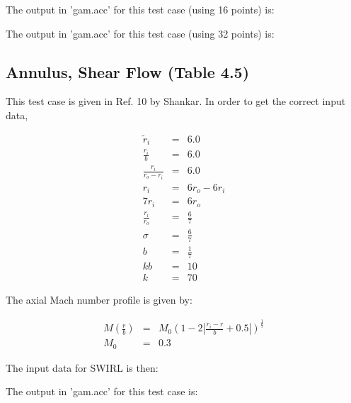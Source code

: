 The output in 'gam.acc' for this test case (using 16 points) is:

\begin{tiny}
\end{tiny}%

The output in 'gam.acc' for this test case (using 32 points) is:

\begin{tiny}
\end{tiny}%

\subsection{Annulus, Shear Flow (Table 4.5)}

This test case is given in Ref. 10 by Shankar.   In order to
get the correct input data,

\begin{eqnarray}
\widetilde{r}_i  
&=& 6.0
\nonumber
\\
\frac{r_i}{b}
&=& 6.0
\nonumber
\\
\frac{r_i}{r_o - r_i}
&=& 6.0
\nonumber
\\
r_i
&=& 6 r_o - 6 r_i
\nonumber
\\
7 r_i
&=& 6 r_o 
\nonumber
\\
\frac{r_i}{r_o}
&=& \frac{6}{7} 
\nonumber
\\
\sigma &=& \frac{6}{7}
\nonumber
\\
b &=& \frac{1}{7}
\nonumber
\\
k b &=& 10
\nonumber
\\
k &=& 70
\nonumber
\end{eqnarray}

The axial Mach number profile is given by:

\begin{eqnarray}
M \left(\frac{r}{b} \right)
&=&
M_0 \left(1 - 2 \left| \frac{r_i - r}{b} + 0.5 \right| \right)^{\frac{1}{7}}
\nonumber
\\
M_0 &=& 0.3
\nonumber
\end{eqnarray}

The input data for SWIRL is then:

\begin{tiny}
\end{tiny}%

The output in 'gam.acc' for this test case is:

\begin{tiny}
\end{tiny}%

